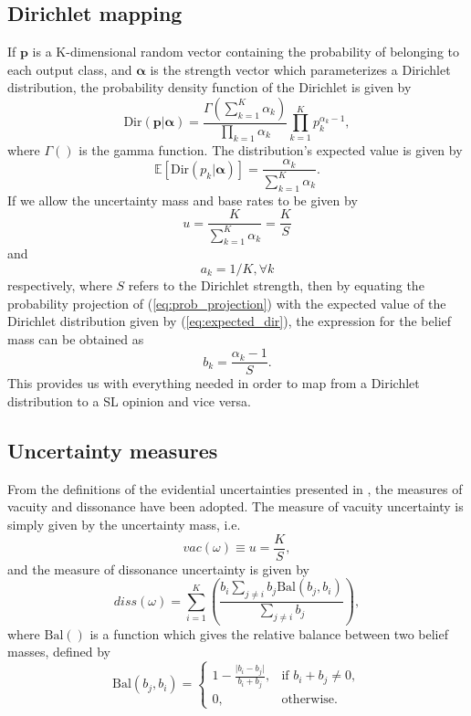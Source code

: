 \documentclass[
twocolumn,
]{ceurart}
\begin{document}
\subsection{Dirichlet mapping}
If $\mathbf{p}$ is a K-dimensional random vector containing the probability of belonging to each output class, and $\boldsymbol{\alpha}$ is the strength vector which parameterizes a Dirichlet distribution, the probability density function of the Dirichlet is given by
\begin{equation}
    \textrm{Dir}(\mathbf{p}|\boldsymbol{\alpha})= \frac{\Gamma(\sum_{k=1}^K\alpha_k)}{\prod_{k=1}\alpha_k}\prod_{k=1}^Kp_k^{\alpha_k-1},
\end{equation}
where $\Gamma()$ is the gamma function.
The distribution's expected value is given by
\begin{equation}
\mathbb{E}\left[\textrm{Dir}(p_k\vert\boldsymbol{\alpha})\right]=\frac{\alpha_k}{\sum_{k=1}^K\alpha_k}.
\label{eq:expected_dir}
\end{equation}
If we allow the uncertainty mass and base rates to be given by
\begin{equation}
    u=\frac{K}{\sum_{k=1}^K\alpha_k}=\frac{K}{S}
\end{equation}
and
\begin{equation}
    a_k=1/K, \forall k
\end{equation}
respectively, where $S$ refers to the Dirichlet strength, then by equating the probability projection of (\ref{eq:prob_projection}) with the expected value of the Dirichlet distribution given by (\ref{eq:expected_dir}), the expression for the belief mass can be obtained as
\begin{equation}
    b_k = \frac{\alpha_k-1}{S}.
\end{equation}
This provides us with everything needed in order to map from a Dirichlet distribution to a SL opinion and vice versa.
\subsection{Uncertainty measures}
From the definitions of the evidential uncertainties presented in \cite{Josang2018}, the measures of vacuity and dissonance have been adopted.
The measure of vacuity uncertainty is simply given by the uncertainty mass, i.e.
\begin{equation}
    vac(\omega)\equiv u = \frac{K}{S},
\label{eq::vacuity}
\end{equation}
and the measure of dissonance uncertainty is given by
\begin{equation}
    diss(\omega)=\sum_{i=1}^K\left(\frac{b_i\sum_{j\neq i}b_j\textrm{Bal}(b_j,b_i)}{\sum_{j\neq i}b_j}\right),
\end{equation}
where $\textrm{Bal}()$ is a function which gives the relative balance between two belief masses, defined by
\begin{equation}
    \textrm{Bal}(b_j,b_i)=\begin{cases}1-\frac{\vert b_i-b_j\vert}{b_i+b_j},&\text{if } b_i+b_j\neq0,\\
    0,&\text{otherwise.}\end{cases}
\end{equation}
\end{document}
